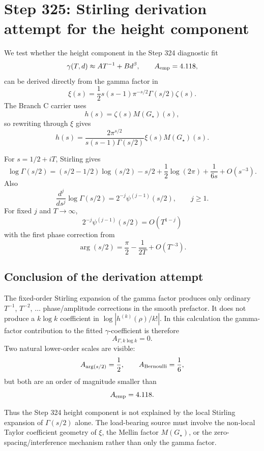 \section*{Step 325: Stirling derivation attempt for the height component}

We test whether the height component in the Step 324 diagnostic fit
\[
  \gamma(T,d)\approx A T^{-1}+B d^\beta,\qquad A_{\rm emp}=4.118,
\]
can be derived directly from the gamma factor in
\[
  \xi(s)=\frac12 s(s-1)\pi^{-s/2}\Gamma(s/2)\zeta(s).
\]
The Branch C carrier uses
\[
  h(s)=\zeta(s)M(G_\star)(s),
\]
so rewriting through \(\xi\) gives
\[
  h(s)=\frac{2\pi^{s/2}}{s(s-1)\Gamma(s/2)}\xi(s)M(G_\star)(s).
\]

For \(s=1/2+iT\), Stirling gives
\[
\log\Gamma(s/2)
  =
  (s/2-1/2)\log(s/2)-s/2+\frac12\log(2\pi)+\frac{1}{6s}
  +O(s^{-3}).
\]
Also
\[
  \frac{d^j}{ds^j}\log\Gamma(s/2)
  =
  2^{-j}\psi^{(j-1)}(s/2),\qquad j\ge 1.
\]
For fixed \(j\) and \(T\to\infty\),
\[
  2^{-j}\psi^{(j-1)}(s/2)
  =
  O(T^{1-j})
\]
with the first phase correction from
\[
  \arg(s/2)=\frac{\pi}{2}-\frac{1}{2T}+O(T^{-3}).
\]

\subsection*{Conclusion of the derivation attempt}

The fixed-order Stirling expansion of the gamma factor produces only ordinary
\(T^{-1}\), \(T^{-2}\), \(\ldots\) phase/amplitude corrections in the smooth
prefactor. It does not produce a \(k\log k\) coefficient in
\(\log|h^{(k)}(\rho)/k!|\). In this calculation the gamma-factor contribution
to the fitted \(\gamma\)-coefficient is therefore
\[
  A_{\Gamma,k\log k}=0.
\]
Two natural lower-order scales are visible:
\[
  A_{\arg(s/2)}=\frac12,\qquad A_{\rm Bernoulli}=\frac16,
\]
but both are an order of magnitude smaller than
\[
  A_{\rm emp}=4.118.
\]

Thus the Step 324 height component is not explained by the local Stirling
expansion of \(\Gamma(s/2)\) alone. The load-bearing source must involve the
non-local Taylor coefficient geometry of \(\xi\), the Mellin factor
\(M(G_\star)\), or the zero-spacing/interference mechanism rather than only the
gamma factor.
